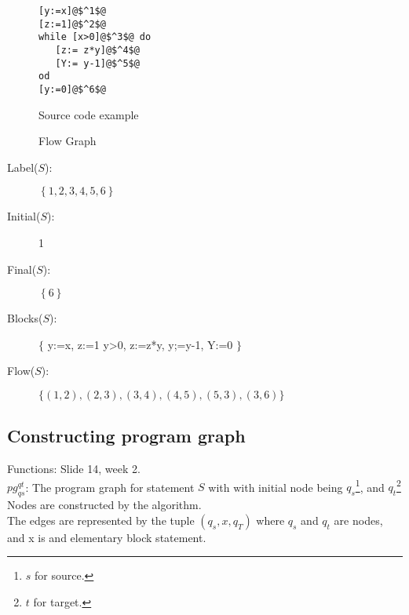 \documentclass[12pt]{article}
\begin{document}
\begin{figure}
\begin{lstlisting}
[y:=x]@$^1$@
[z:=1]@$^2$@
while [x>0]@$^3$@ do
   [z:= z*y]@$^4$@
   [Y:= y-1]@$^5$@
od
[y:=0]@$^6$@
\end{lstlisting}
\label{source:example1}
\caption{Source code example}
\end{figure}

\begin{figure}


\caption{Flow Graph}

\end{figure}

\begin{description}
\item[Label($S$):] $\left\lbrace   1,2,3,4,5,6   \right\rbrace$
\item[Initial($S$):] 1
\item[Final($S$):] $\left\lbrace   6   \right\rbrace$
\item[Blocks($S$):]$\{$ y:=x, z:=1 y>0, z:=z*y, y;=y-1, Y:=0 $\}$
\item[Flow($S$):] $\{ (1,2), (2,3), (3,4), (4,5), (5,3), (3,6) \}$
\end{description}

\subsection*{Constructing program graph}
Functions: Slide 14, week 2.\\
$pg^{qt}_{qs}$: The program graph for statement $S$ with with initial node being $q_{s}$\footnote{$s$ for source.}, and $q_{t}$\footnote{$t$ for target.}\\
Nodes are constructed by the algorithm.\\
The edges are represented by the tuple $(q_s, x, q_T)$ where $q_s$ and $q_t$ are nodes, and x is and elementary block statement. %
\end{document}
